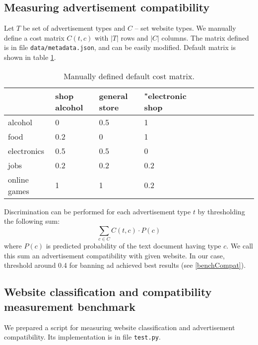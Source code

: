 \documentclass[a4paper]{article}
\begin{document}
\subsection{Measuring advertisement compatibility}
\label{mainlogic}

Let $T$ be set of advertisement types and $C$ -- set website types.
We manually define a cost matrix $C(t, c)$ 
with $|T|$ rows and $|C|$ columns.
The matrix defined is in file \texttt{data/metadata.json},
and can be easily modified. Default matrix is shown in table \ref{table:costmx}.

\begin{table}[!hbt]
    \caption{Manually defined default cost matrix.
    \label{table:costmx}
    }
\footnotesize
\begin{center}
    \begin{tabular}{|l|l|l|l|l|l|l|l|l|l|l|}
    \hline
        & shop alcohol & general store  & "electronic shop \\
    \hline
          alcohol & 0& 0.5&   1 \\
    \hline
        food & 0.2&   0&   1 \\
    \hline
        electronics & 0.5& 0.5&   0 \\
    \hline
        jobs & 0.2& 0.2& 0.2 \\
    \hline
          online games & 1&   1& 0.2 \\
    \hline
    \end{tabular}
\end{center}
\end{table}

Discrimination can be performed for each advertisement type $t$
by thresholding the following sum:
\begin{equation}
    \sum_{c\in{C}} {C(t, c) \cdot P(c)}
\end{equation}
where $P(c)$ is predicted probability of the text document having type $c$.
We call this sum an advertisement compatibility with given website.
In our case, threshold around 0.4 for banning ad achieved best results (see \ref{benchCompat}).

\subsection{Website classification and compatibility measurement benchmark}
\label{bench}

We prepared a script for measuring website classification and
advertisement compatibility.
Its implementation is in file \texttt{test.py}.
\end{document}
